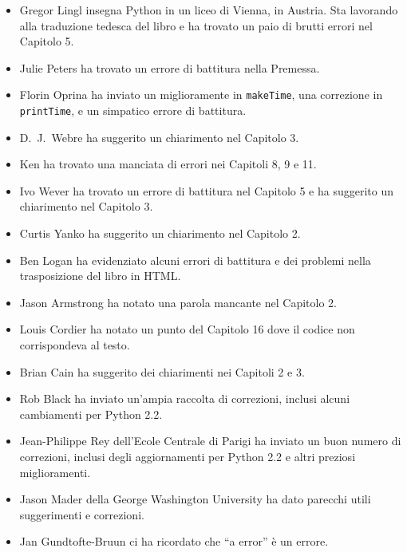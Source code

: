 \documentclass[10pt]{book}
\begin{document}
\begin{itemize}
\item Gregor Lingl insegna Python in un liceo di Vienna, in Austria. Sta lavorando alla traduzione tedesca del libro e ha trovato un paio di brutti errori nel Capitolo 5.

\item Julie Peters ha trovato un errore di battitura nella Premessa.

\item Florin Oprina ha inviato un miglioramente in {\tt makeTime},
una correzione in {\tt printTime}, e un simpatico errore di battitura.

\item D.~J.~Webre ha suggerito un chiarimento nel Capitolo 3.

\item Ken ha trovato una manciata di errori nei Capitoli 8, 9 e 11.

\item Ivo Wever ha trovato un errore di battitura nel Capitolo 5 e ha suggerito un chiarimento nel Capitolo 3.

\item Curtis Yanko ha suggerito un chiarimento nel Capitolo 2.

\item Ben Logan ha evidenziato alcuni errori di battitura e dei problemi nella trasposizione del libro in HTML.

\item Jason Armstrong ha notato una parola mancante nel Capitolo 2.

\item Louis Cordier ha notato un punto del Capitolo 16 dove il codice non corrispondeva al testo.

\item Brian Cain ha suggerito dei chiarimenti nei Capitoli 2 e 3.

\item Rob Black ha inviato un'ampia raccolta di correzioni, inclusi alcuni cambiamenti per Python 2.2.

\item Jean-Philippe Rey dell'Ecole Centrale di Parigi ha inviato un buon numero di correzioni, inclusi degli aggiornamenti per Python 2.2 e altri preziosi miglioramenti.

\item Jason Mader della George Washington University ha dato parecchi utili suggerimenti e correzioni.

\item Jan Gundtofte-Bruun ci ha ricordato che ``a error'' è un errore.


\end{itemize}
\end{document}
